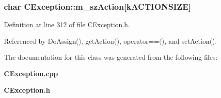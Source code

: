 \subsubsection{\setlength{\rightskip}{0pt plus 5cm}char CException::m\_\-sz\-Action[k\-ACTIONSIZE]\hspace{0.3cm}{\tt  [private]}}\label{classCException_o0}




Definition at line 312 of file CException.h.

Referenced by Do\-Assign(), get\-Action(), operator==(), and set\-Action().

The documentation for this class was generated from the following files:\begin{CompactItemize}
\item 
{\bf CException.cpp}\item 
{\bf CException.h}\end{CompactItemize}
